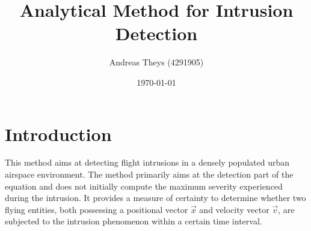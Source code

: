 \documentclass{article}
\title{Analytical Method for Intrusion Detection}
\author{Andreas Theys (4291905)}
\date{\today}
\begin{document}
\maketitle

\section*{Introduction}
This method aims at detecting flight intrusions in a densely populated urban airspace environment. The method primarily aims at the detection part of the equation and does not initially compute the maximum severity experienced during the intrusion. It provides a measure of certainty to determine whether two flying entities, both possessing a positional vector $\vec{x}$ and velocity vector $\vec{v}$, are subjected to the intrusion phenomenon within a certain time interval.     
\end{document}
